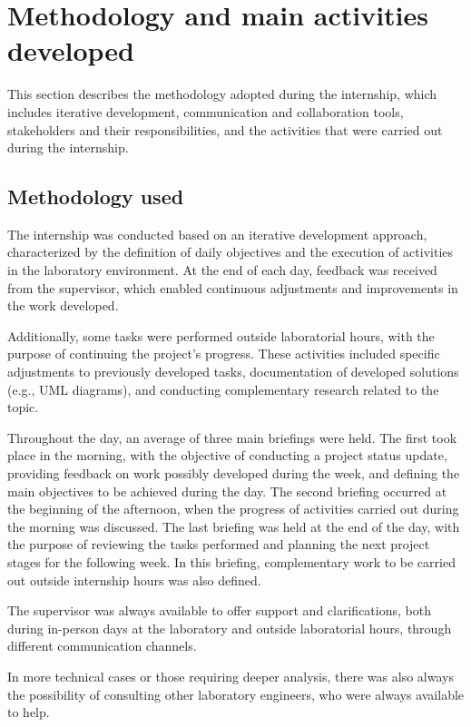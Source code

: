 \section{Methodology and main activities developed}

This section describes the methodology adopted during the internship, which includes iterative development, communication and collaboration tools, stakeholders and their responsibilities, and the activities that were carried out during the internship.

\subsection{Methodology used}
The internship was conducted based on an iterative development approach, characterized by the definition of daily objectives and the execution of activities in the laboratory environment. At the end of each day, feedback was received from the supervisor, which enabled continuous adjustments and improvements in the work developed.

Additionally, some tasks were performed outside laboratorial hours, with the purpose of continuing the project's progress. These activities included specific adjustments to previously developed tasks, documentation of developed solutions (e.g., UML diagrams), and conducting complementary research related to the topic.

Throughout the day, an average of three main briefings were held. The first took place in the morning, with the objective of conducting a project status update, providing feedback on work possibly developed during the week, and defining the main objectives to be achieved during the day. The second briefing occurred at the beginning of the afternoon, when the progress of activities carried out during the morning was discussed. The last briefing was held at the end of the day, with the purpose of reviewing the tasks performed and planning the next project stages for the following week. In this briefing, complementary work to be carried out outside internship hours was also defined.

The supervisor was always available to offer support and clarifications, both during in-person days at the laboratory and outside laboratorial hours, through different communication channels.

In more technical cases or those requiring deeper analysis, there was also always the possibility of consulting other laboratory engineers, who were always available to help.

